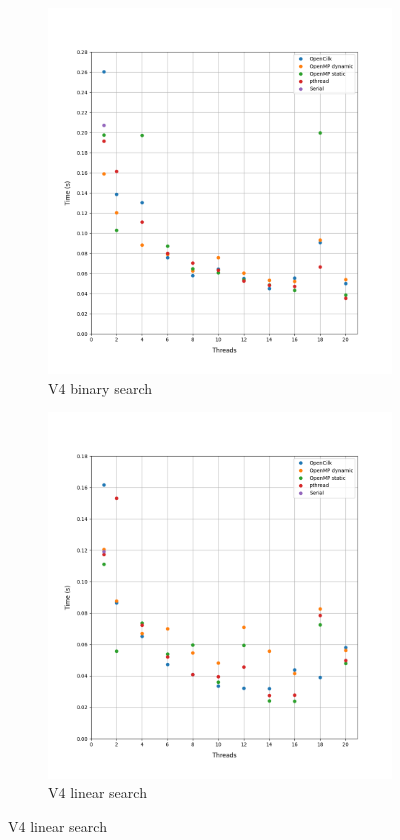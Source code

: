 \documentclass[12pt, a4paper]{article}
\begin{document}
\begin{figure}[h!]
\begin{subfigure}[b]{0.33\textwidth}
         \includegraphics[height=.4\textheight, width=\textwidth, keepaspectratio]{assets/dblp/v4_binary.png}
         \caption{V4 binary search}
     \end{subfigure}
     \begin{subfigure}[b]{0.33\textwidth}
         \centering
         \includegraphics[height=.4\textheight, width=\textwidth, keepaspectratio]{assets/dblp/v4_linear.png}
         \caption{V4 linear search} 
     \end{subfigure}
\end{figure}
\end{document}
